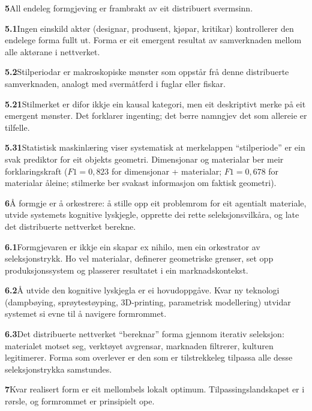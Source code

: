 \documentclass[12pt, a4paper]{article}
\begin{document}
\noindent\textbf{5}\quad All endeleg formgjeving er frambrakt av eit distribuert svermsinn.

\medskip
\noindent\textbf{5.1}\quad Ingen einskild aktør (designar, produsent, kjøpar, kritikar) kontrollerer den endelege forma fullt ut. Forma er eit emergent resultat av samverknaden mellom alle aktørane i nettverket.

\medskip
\noindent\textbf{5.2}\quad Stilperiodar er makroskopiske mønster som oppstår frå denne distribuerte samverknaden, analogt med svermåtferd i fuglar eller fiskar.

\medskip
\noindent\textbf{5.21}\quad Stilmerket er difor ikkje ein kausal kategori, men eit deskriptivt merke på eit emergent mønster. Det forklarer ingenting; det berre namngjev det som allereie er tilfelle.

\medskip
\noindent\textbf{5.31}\quad Statistisk maskinlæring viser systematisk at merkelappen ``stilperiode'' er ein svak prediktor for eit objekts geometri. Dimensjonar og materialar ber meir forklaringskraft ($F1 = 0{,}823$ for dimensjonar + materialar; $F1 = 0{,}678$ for materialar åleine; stilmerke ber svakast informasjon om faktisk geometri).

\bigskip

\noindent\textbf{6}\quad Å formgje er å orkestrere: å stille opp eit problemrom for eit agentialt materiale, utvide systemets kognitive lyskjegle, opprette dei rette seleksjonsvilkåra, og late det distribuerte nettverket berekne.

\medskip
\noindent\textbf{6.1}\quad Formgjevaren er ikkje ein skapar ex nihilo, men ein orkestrator av seleksjonstrykk. Ho vel materialar, definerer geometriske grenser, set opp produksjonssystem og plasserer resultatet i ein marknadskontekst.

\medskip
\noindent\textbf{6.2}\quad Å utvide den kognitive lyskjegla er ei hovudoppgåve. Kvar ny teknologi (dampbøying, sprøytestøyping, 3D-printing, parametrisk modellering) utvidar systemet si evne til å navigere formrommet.

\medskip
\noindent\textbf{6.3}\quad Det distribuerte nettverket ``bereknar'' forma gjennom iterativ seleksjon: materialet motset seg, verktøyet avgrensar, marknaden filtrerer, kulturen legitimerer. Forma som overlever er den som er tilstrekkeleg tilpassa alle desse seleksjonstrykka samstundes.

\bigskip

\noindent\textbf{7}\quad Kvar realisert form er eit mellombels lokalt optimum. Tilpassingslandskapet er i rørsle, og formrommet er prinsipielt ope.
\end{document}
